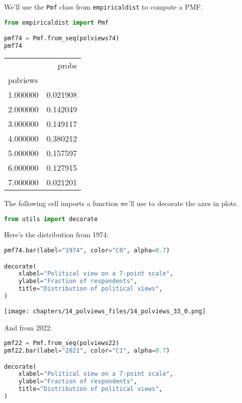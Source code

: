 We'll use the \passthrough{\lstinline!Pmf!} class from
\passthrough{\lstinline!empiricaldist!} to compute a PMF.

\begin{lstlisting}[language=Python,style=source]
from empiricaldist import Pmf

pmf74 = Pmf.from_seq(polviews74)
pmf74
\end{lstlisting}

\begin{tabular}{lr}
\midrule
 & probs \\
polviews &  \\
\midrule
1.000000 & 0.021908 \\
2.000000 & 0.142049 \\
3.000000 & 0.149117 \\
4.000000 & 0.380212 \\
5.000000 & 0.157597 \\
6.000000 & 0.127915 \\
7.000000 & 0.021201 \\
\midrule
\end{tabular}

The following cell imports a function we'll use to decorate the axes in
plots.

\begin{lstlisting}[language=Python,style=source]
from utils import decorate
\end{lstlisting}

Here's the distribution from 1974:

\begin{lstlisting}[language=Python,style=source]
pmf74.bar(label="1974", color="C0", alpha=0.7)

decorate(
    xlabel="Political view on a 7-point scale",
    ylabel="Fraction of respondents",
    title="Distribution of political views",
)
\end{lstlisting}

\begin{center}
\texttt{[image: chapters/14\_polviews\_files/14\_polviews\_33\_0.png]}
\end{center}

And from 2022:

\begin{lstlisting}[language=Python,style=source]
pmf22 = Pmf.from_seq(polviews22)
pmf22.bar(label="2021", color="C1", alpha=0.7)

decorate(
    xlabel="Political view on a 7-point scale",
    ylabel="Fraction of respondents",
    title="Distribution of political views",
)
\end{lstlisting}

